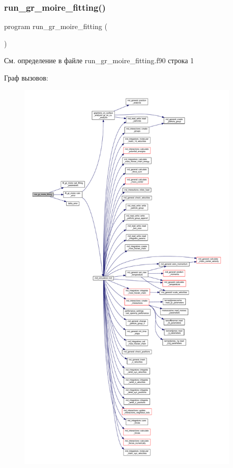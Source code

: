 \subsubsection{\texorpdfstring{run\+\_\+gr\+\_\+moire\+\_\+fitting()}{run\_gr\_moire\_fitting()}}
{\footnotesize\ttfamily program run\+\_\+gr\+\_\+moire\+\_\+fitting (\begin{DoxyParamCaption}{ }\end{DoxyParamCaption})}



См. определение в файле run\+\_\+gr\+\_\+moire\+\_\+fitting.\+f90 строка 1

Граф вызовов\+:\nopagebreak
\begin{figure}[H]
\begin{center}
\leavevmode
\includegraphics[height=550pt]{run__gr__moire__fitting_8f90_a3f54721279f970a03ea533479dbc2bd1_cgraph}
\end{center}
\end{figure}
